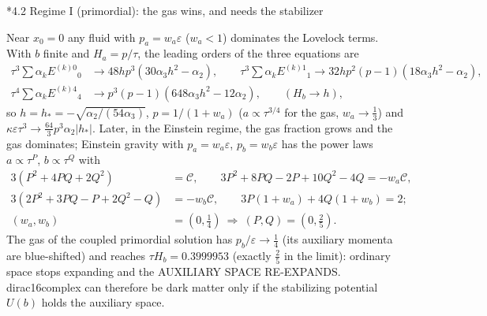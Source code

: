 \documentclass[10pt,a4paper]{article}
\makeatletter
\renewcommand\subsection{\@startsection{subsection}{2}{\z@}{-3.25ex\@plus -1ex \@minus -.2ex}{1.5ex \@plus .2ex}{\normalfont\large\bfseries\raggedright}}
\makeatother
\begin{document}
\subsection*{4.2 Regime I (primordial): the gas wins, and needs the stabilizer}
Near $x_0=0$ any fluid with $p_a=w_a\varepsilon$ ($w_a<1$) dominates the Lovelock terms. With $b$ finite and $H_a=p/\tau$, the leading orders of the three equations are
\begin{align*}
\tau^3\textstyle\sum\alpha_kE^{(k)0}{}_0&\to48hp^3(30\alpha_3h^2-\alpha_2),\qquad \tau^3\textstyle\sum\alpha_kE^{(k)1}{}_1\to32hp^2(p-1)(18\alpha_3h^2-\alpha_2), \\
\tau^4\textstyle\sum\alpha_kE^{(k)4}{}_4&\to p^3(p-1)(648\alpha_3h^2-12\alpha_2),\qquad (H_b\to h),
\end{align*}
so $h=h_*=-\sqrt{\alpha_2/(54\alpha_3)}$, $p=1/(1+w_a)$ ($a\propto\tau^{3/4}$ for the gas, $w_a\to\frac13$) and $\kappa\varepsilon\tau^3\to\frac{64}3p^3\alpha_2|h_*|$. Later, in the Einstein regime, the gas fraction grows and the gas dominates; Einstein gravity with $p_a=w_a\varepsilon$, $p_b=w_b\varepsilon$ has the power laws $a\propto\tau^P$, $b\propto\tau^Q$ with
\begin{align*}
3(P^2+4PQ+2Q^2)&=\mathcal C,\qquad 3P^2+8PQ-2P+10Q^2-4Q=-w_a\mathcal C, \\
3(2P^2+3PQ-P+2Q^2-Q)&=-w_b\mathcal C,\qquad 3P(1+w_a)+4Q(1+w_b)=2; \\
(w_a,w_b)&=(0,\tfrac14)\ \Rightarrow\ (P,Q)=(0,\tfrac25).
\end{align*}
The gas of the coupled primordial solution has $p_b/\varepsilon\to\frac14$ (its auxiliary momenta are blue-shifted) and reaches $\tau H_b=0.3999953$ (exactly $\frac25$ in the limit): ordinary space stops expanding and the AUXILIARY SPACE RE-EXPANDS. dirac16complex can therefore be dark matter only if the stabilizing potential $U(b)$ holds the auxiliary space.
\end{document}
